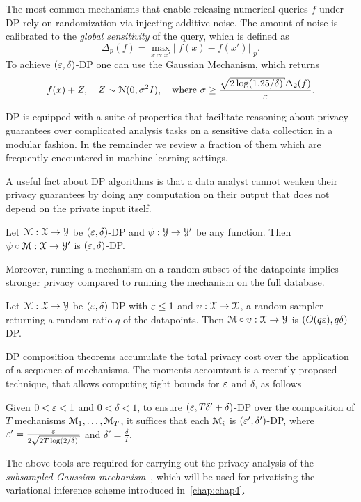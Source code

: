 The most common mechanisms that enable releasing numerical queries $f$ under DP rely on randomization via injecting additive noise. The amount of noise is calibrated to the \emph{global sensitivity} of the query, which is defined as 
\[
\Delta_p(f) = \underset{x \approx x'}{\max} ||f(x)-f(x')||_p.
\]
To achieve $(\varepsilon, \delta)$-DP one can use the Gaussian Mechanism, which returns
\[
f(x)+Z, \quad Z \sim \mcN(0, \sigma^2 I), \quad \text{where } \sigma \geq \frac{\sqrt{2\log(1.25/\delta)}\Delta_2(f)}{\veps}.
\]

DP is equipped with a suite of properties that facilitate reasoning about privacy guarantees over complicated analysis tasks on a sensitive data collection in a modular fashion. In the remainder we review a fraction of them which are frequently encountered in machine learning settings.

A useful fact about DP algorithms is that a data analyst cannot weaken their privacy guarantees by doing any computation on their output that does not depend on the private input itself.

	Let $ \mathcal{M}: \mathcal{X} \rightarrow \mathcal{Y}$ be $(\varepsilon, \delta)$-DP and $\psi:\mathcal{Y} \rightarrow \mathcal{Y}'$ be any function. Then $\psi \circ \mathcal{M}: \mathcal{X} \rightarrow \mathcal{Y}'$ is $(\varepsilon, \delta)$-DP.
	\label{prop:bdp-postprocessing}
\enprop

Moreover, running a mechanism on a random subset of the datapoints implies stronger privacy compared to running the mechanism on the full database.

Let $ \mathcal{M}: \mathcal{X} \rightarrow \mathcal{Y}$ be $(\varepsilon, \delta)$-DP with $\varepsilon \leq 1$ and $\upsilon: \mathcal{X} \rightarrow \mathcal{X}$, a random sampler returning a random ratio $q$ of the datapoints. Then $\mathcal{M} \circ \upsilon: \mathcal{X} \rightarrow \mathcal{Y}$ is $(O(q\varepsilon), q\delta)$-DP.
\label{prop:bdp-postprocessing}
\enprop

DP composition theorems accumulate the total privacy cost over the application of a sequence of mechanisms. The moments accountant is a recently proposed technique, that allows computing tight bounds for $\varepsilon$ and $\delta$, as follows

Given $0<\varepsilon<1$ and $0<\delta<1$, to ensure $(\varepsilon, T\delta'+\delta)$-DP over the composition of $T$ mechanisms $\mathcal{M}_1,\ldots,\mathcal{M}_T$, it suffices that each $\mathcal{M}_i$ is $(\varepsilon', \delta')$-DP, where $\veps'=\frac{\veps}{2\sqrt{2T\log(2/\delta)}}$ and $\delta'=\frac{\delta}{T}$. 
\label{prop:bmoments-accountant}
\enprop

The above tools are required for carrying out the privacy analysis of the \emph{subsampled Gaussian mechanism}~\citep{abadi16}, which will be used for privatising the variational inference scheme introduced in~\cref{chap:chap4}.



